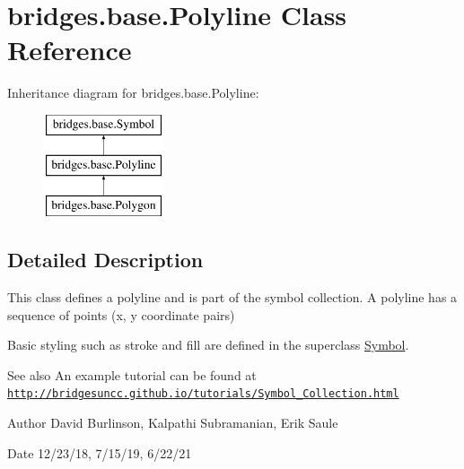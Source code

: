 \hypertarget{classbridges_1_1base_1_1_polyline}{}\section{bridges.\+base.\+Polyline Class Reference}
\label{classbridges_1_1base_1_1_polyline}
Inheritance diagram for bridges.\+base.\+Polyline\+:\begin{figure}[H]
\begin{center}
\leavevmode
\includegraphics[height=3.000000cm]{classbridges_1_1base_1_1_polyline}
\end{center}
\end{figure}


\subsection{Detailed Description}
This class defines a polyline and is part of the symbol collection. A polyline has a sequence of points (x, y coordinate pairs) 

Basic styling such as stroke and fill are defined in the superclass \hyperlink{classbridges_1_1base_1_1_symbol}{Symbol}.

\begin{DoxySeeAlso}{See also}
An example tutorial can be found at \href{http://bridgesuncc.github.io/tutorials/Symbol_Collection.html}{\tt http\+://bridgesuncc.\+github.\+io/tutorials/\+Symbol\+\_\+\+Collection.\+html}
\end{DoxySeeAlso}
\begin{DoxyAuthor}{Author}
David Burlinson, Kalpathi Subramanian, Erik Saule 
\end{DoxyAuthor}
\begin{DoxyDate}{Date}
12/23/18, 7/15/19, 6/22/21 
\end{DoxyDate}
